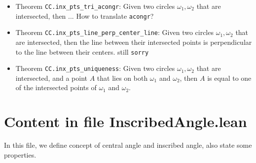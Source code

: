 \documentclass[12pt]{amsart}
\begin{document}
\begin{itemize}
    \item Theorem \verb|CC.inx_pts_tri_acongr|: Given two circles $\omega_1,\omega_2$ that are intersected, then ... {\color{red} How to translate \verb|acongr|?}
    \item Theorem \verb|CC.inx_pts_line_perp_center_line|: Given two circles $\omega_1,\omega_2$ that are intersected, then the line between their intersected points is perpendicular to the line between their centers. {\color{red} still \verb|sorry|}
    \item Theorem \verb|CC.inx_pts_uniqueness|: Given two circles $\omega_1,\omega_2$ that are intersected, and a point $A$ that lies on both $\omega_1$ and $\omega_2$, then $A$ is equal to one of the intersected points of $\omega_1$ and $\omega_2$.
\end{itemize}


\section{Content in file InscribedAngle.lean}
In this file, we define concept of central angle and inscribed angle, also state some properties.
\end{document}
